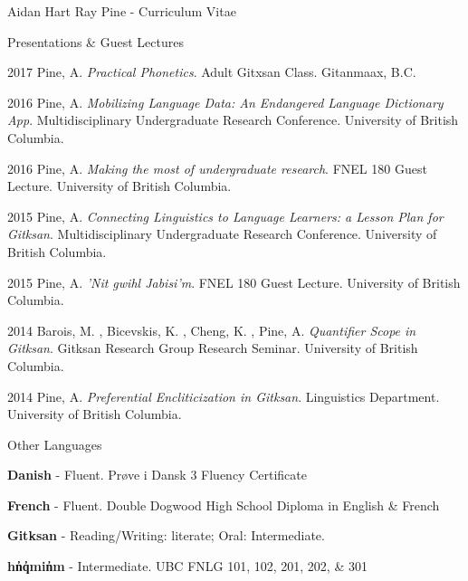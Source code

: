 \documentclass[12pt]{letter}
\begin{document}
\begin{cv}{ Aidan Hart Ray Pine  \space - \space   Curriculum Vitae}
\begin{cvlist}{Presentations \& Guest Lectures}
                    \item[2017]  Pine,  A.   \textit{Practical Phonetics}. Adult Gitxsan Class. Gitanmaax, B.C.  
                    \item[2016]  Pine,  A.   \textit{Mobilizing Language Data: An Endangered Language Dictionary App}. Multidisciplinary Undergraduate Research Conference. University of British Columbia.  
                    \item[2016]  Pine,  A.   \textit{Making the most of undergraduate research}. FNEL 180 Guest Lecture. University of British Columbia.  
                    \item[2015]  Pine,  A.   \textit{Connecting Linguistics to Language Learners: a Lesson Plan for Gitksan}. Multidisciplinary Undergraduate Research Conference. University of British Columbia.  
                    \item[2015]  Pine,  A.   \textit{'Nit gwihl Jabisi'm}. FNEL 180 Guest Lecture. University of British Columbia.  
                    \item[2014]  Barois,  M. ,  Bicevskis,  K. ,  Cheng,  K. ,  Pine,  A.   \textit{Quantifier Scope in Gitksan}. Gitksan Research Group Research Seminar. University of British Columbia.  
                    \item[2014]  Pine,  A.   \textit{Preferential Encliticization in Gitksan}. Linguistics Department. University of British Columbia.  
                   
        \end{cvlist}
        \begin{cvlist}{Other Languages}
                            \item \textbf{Danish} - Fluent. Pr{\o}ve i Dansk 3 Fluency Certificate
                            \item \textbf{French} - Fluent. Double Dogwood High School Diploma in English \& French
                            \item \textbf{Gitksan} - Reading/Writing: literate; Oral: Intermediate. 
                            \item \textbf{h{\textschwa}n̓q̓{\textschwa}min̓{\textschwa}m} - Intermediate. UBC FNLG 101, 102, 201, 202, \& 301
                    \end{cvlist}
        

\end{cv}
\end{document}

